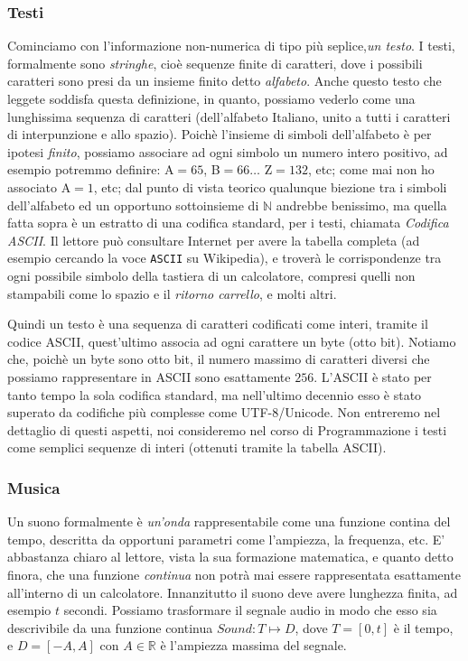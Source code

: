 \subsubsection{Testi}
 Cominciamo con l'informazione non-numerica di tipo più seplice,\emph{un testo}. I testi, formalmente sono \emph{stringhe}, cioè sequenze finite di caratteri, dove i possibili caratteri sono presi da un insieme finito detto \emph{alfabeto}. Anche questo testo che leggete soddisfa questa definizione,
 in quanto, possiamo vederlo come una lunghissima sequenza di caratteri (dell'alfabeto Italiano, unito a tutti i caratteri di interpunzione e allo spazio). Poichè l'insieme di simboli dell'alfabeto è per ipotesi \emph{finito},
 possiamo associare ad ogni simbolo un numero intero positivo, ad esempio potremmo definire: \textsf{A}$=65$, \textsf{B}$=66 \ldots$ \textsf{Z}$=132$, etc; come mai non ho associato \textsf{A}$=1$, etc; dal punto di vista teorico
qualunque biezione tra i simboli dell'alfabeto ed un opportuno sottoinsieme di $\mathbb{N}$ andrebbe benissimo, ma quella fatta sopra è un estratto di una codifica standard, per i testi, chiamata \emph{Codifica ASCII}. Il lettore può consultare Internet per avere la tabella completa (ad esempio cercando la voce \texttt{ASCII} su Wikipedia), e troverà le corrispondenze tra ogni possibile simbolo della tastiera di un calcolatore, compresi quelli non stampabili come lo spazio e il \emph{ritorno carrello}, e molti altri.

Quindi un testo è una sequenza di caratteri codificati come interi, tramite il codice ASCII, quest'ultimo associa ad ogni carattere un byte (otto bit). Notiamo che, poichè un byte sono otto bit, il numero massimo di caratteri diversi che possiamo rappresentare in ASCII sono esattamente $256$. L'ASCII è stato per tanto tempo la sola codifica standard, ma nell'ultimo decennio esso è stato superato da codifiche più complesse come UTF-8/Unicode. Non entreremo nel dettaglio di questi aspetti, noi consideremo nel corso di Programmazione  i testi come semplici sequenze di interi (ottenuti tramite la tabella ASCII).

\subsubsection{Musica}

Un suono formalmente è \emph{un'onda} rappresentabile come una
funzione contina del tempo, descritta da opportuni parametri come l'ampiezza, la
frequenza, etc. E' abbastanza chiaro al lettore, vista la sua formazione matematica, e quanto detto finora, che una funzione \emph{continua} non potrà mai essere rappresentata esattamente all'interno di un calcolatore. Innanzitutto il suono deve avere lunghezza
finita, ad esempio $t$ secondi. Possiamo trasformare il segnale audio in modo che esso sia descrivibile da una funzione continua $Sound: T \mapsto D$, dove $T
= [0,t]$ è il tempo, e $D = [-A,A]$ con $A \in \mathbb{R}$ è l'ampiezza massima
del segnale.

